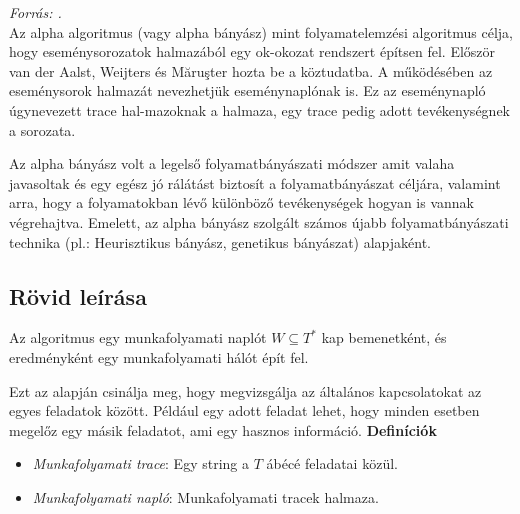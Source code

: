 

 \textit{Forrás: \cite{wiki:001}.}\\

Az alpha algoritmus (vagy alpha bányász) mint folyamatelemzési algoritmus célja, hogy eseménysorozatok halmazából egy ok-okozat rendszert építsen fel. Először van der Aalst, Weijters és Măruşter hozta be a köztudatba. A működésében az eseménysorok halmazát nevezhetjük eseménynaplónak is. Ez az eseménynapló úgynevezett trace hal\hyp{}mazoknak a halmaza, egy trace pedig adott tevékenységnek a sorozata.

Az alpha bányász volt a legelső folyamatbányászati módszer amit valaha javasoltak és egy egész jó rálátást biztosít a folyamatbányászat céljára, valamint arra, hogy a folyamatokban lévő különböző tevékenységek hogyan is vannak végrehajtva. Emelett, az alpha bányász szolgált számos újabb folyamatbányászati technika (pl.: Heurisztikus bányász, genetikus bányászat) alapjaként.

\subsection{Rövid leírása}	

Az algoritmus egy munkafolyamati naplót $W \subseteq  T^*$ kap bemenetként, és eredményként egy munkafolyamati hálót épít fel.

Ezt az alapján csinálja meg, hogy megvizsgálja az általános kapcsolatokat az egyes feladatok között. Például egy adott feladat lehet, hogy minden esetben megelőz egy másik feladatot, ami egy hasznos információ.
\newline\newline
\textbf{Definíciók}
\begin{itemize}
\item \textit{Munkafolyamati trace}: Egy string a $T$ ábécé feladatai közül.
\item \textit{Munkafolyamati napló}: Munkafolyamati tracek halmaza.
\end{itemize}

